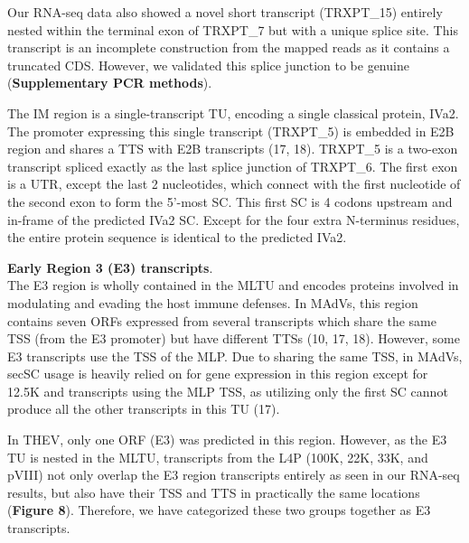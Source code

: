 \documentclass[
]{article}
\begin{document}
Our RNA-seq data also showed a novel short transcript (TRXPT\_15)
entirely nested within the terminal exon of TRXPT\_7 but with a unique
splice site. This transcript is an incomplete construction from the
mapped reads as it contains a truncated CDS. However, we validated this
splice junction to be genuine (\textbf{Supplementary PCR methods}).

The IM region is a single-transcript TU, encoding a single classical
protein, IVa2. The promoter expressing this single transcript (TRXPT\_5)
is embedded in E2B region and shares a TTS with E2B transcripts (17,
18). TRXPT\_5 is a two-exon transcript spliced exactly as the last
splice junction of TRXPT\_6. The first exon is a UTR, except the last 2
nucleotides, which connect with the first nucleotide of the second exon
to form the 5'-most SC. This first SC is 4 codons upstream and in-frame
of the predicted IVa2 SC. Except for the four extra N-terminus residues,
the entire protein sequence is identical to the predicted IVa2.

\textbf{Early Region 3 (E3) transcripts}.\\
The E3 region is wholly contained in the MLTU and encodes proteins
involved in modulating and evading the host immune defenses. In MAdVs,
this region contains seven ORFs expressed from several transcripts which
share the same TSS (from the E3 promoter) but have different TTSs (10,
17, 18). However, some E3 transcripts use the TSS of the MLP. Due to
sharing the same TSS, in MAdVs, secSC usage is heavily relied on for
gene expression in this region except for 12.5K and transcripts using
the MLP TSS, as utilizing only the first SC cannot produce all the other
transcripts in this TU (17).

In THEV, only one ORF (E3) was predicted in this region. However, as the
E3 TU is nested in the MLTU, transcripts from the L4P (100K, 22K, 33K,
and pVIII) not only overlap the E3 region transcripts entirely as seen
in our RNA-seq results, but also have their TSS and TTS in practically
the same locations (\textbf{Figure 8}). Therefore, we have categorized
these two groups together as E3 transcripts.
\end{document}
